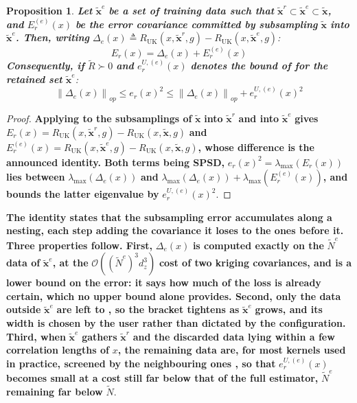 \documentclass[preprint]{elsarticle}
\newtheorem{proposition}{Proposition}
\begin{document}
\begin{proposition}
    \textbf{Let} $\tilde{\mathbf{x}}^e$ \textbf{be a set of training data such that} $\tilde{\mathbf{x}}^r\subset\tilde{\mathbf{x}}^e\subset\tilde{\mathbf{x}}$\textbf{, and} $E_r^{(e)}(x)$ \textbf{be the error covariance committed by subsampling} $\tilde{\mathbf{x}}$ \textbf{into} $\tilde{\mathbf{x}}^e$\textbf{. Then, writing} $\Delta_e(x)\triangleq R_{\mathrm{UK}}(x,\tilde{\mathbf{x}}^r,g)-R_{\mathrm{UK}}(x,\tilde{\mathbf{x}}^e,g)$:
    \begin{equation*}
        E_r(x)=\Delta_e(x)+E_r^{(e)}(x)
    \end{equation*}
    \textbf{Consequently, if} $\tilde{R}\succ0$ \textbf{and} $e_r^{U,(e)}(x)$ \textbf{denotes the bound of  for the retained set} $\tilde{\mathbf{x}}^e$:
    \begin{equation*}
        \left\|\Delta_e(x)\right\|_{op}\leq e_r(x)^2\leq\left\|\Delta_e(x)\right\|_{op}+e_r^{U,(e)}(x)^2
    \end{equation*}\label{th:nested_bound}
    \vspace{-\baselineskip}
\end{proposition}

\begin{proof}
    \textbf{Applying  to the subsamplings of} $\tilde{\mathbf{x}}$ \textbf{into} $\tilde{\mathbf{x}}^r$ \textbf{and into} $\tilde{\mathbf{x}}^e$ \textbf{gives} $E_r(x)=R_{\mathrm{UK}}(x,\tilde{\mathbf{x}}^r,g)-R_{\mathrm{UK}}(x,\tilde{\mathbf{x}},g)$ \textbf{and} $E_r^{(e)}(x)=R_{\mathrm{UK}}(x,\tilde{\mathbf{x}}^e,g)-R_{\mathrm{UK}}(x,\tilde{\mathbf{x}},g)$\textbf{, whose difference is the announced identity. Both terms being SPSD,} $e_r(x)^2=\lambda_{\max}(E_r(x))$ \textbf{lies between} $\lambda_{\max}(\Delta_e(x))$ \textbf{and} $\lambda_{\max}(\Delta_e(x))+\lambda_{\max}\left(E_r^{(e)}(x)\right)$\textbf{, and  bounds the latter eigenvalue by} $e_r^{U,(e)}(x)^2$.
\end{proof}

\textbf{The identity states that the subsampling error accumulates along a nesting, each step adding the covariance it loses to the ones before it. Three properties follow. First,} $\Delta_e(x)$ \textbf{is computed exactly on the} $\tilde{N}^e$ \textbf{data of} $\tilde{\mathbf{x}}^e$\textbf{, at the} $\mathcal{O}\left(\left(\tilde{N}^e\right)^3d_z^3\right)$ \textbf{cost of two kriging covariances, and is a lower bound on the error: it says how much of the loss is already certain, which no upper bound alone provides. Second, only the data outside} $\tilde{\mathbf{x}}^e$ \textbf{are left to , so the bracket tightens as} $\tilde{\mathbf{x}}^e$ \textbf{grows, and its width is chosen by the user rather than dictated by the configuration. Third, when} $\tilde{\mathbf{x}}^e$ \textbf{gathers} $\tilde{\mathbf{x}}^r$ \textbf{and the discarded data lying within a few correlation lengths of} $x$\textbf{, the remaining data are, for most kernels used in practice, screened by the neighbouring ones \cite{bib:screening-effect}, so that} $e_r^{U,(e)}(x)$ \textbf{becomes small at a cost still far below that of the full estimator,} $\tilde{N}^e$ \textbf{remaining far below} $\tilde{N}$.
\end{document}
